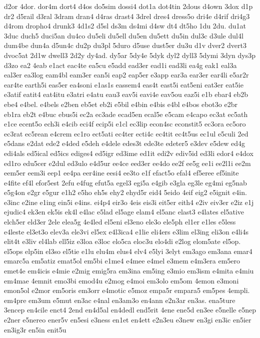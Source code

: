 {d2or
4dor.
dor4m
dort4
d4os
do5sim
dossi4
dot1a
dot4tin
2dous
d4own
3dox
d1p
dr2
d5rail
d3ral
3dram
dran4
d4ras
drast4
3drel
dres4
dress5o
dri4e
d4rif
dri4g3
d4rom
dropho4
drunk3
4d1s2
d5sl
ds3m
ds4mi
d4sw
dt4
dt5ho
1du
2du.
du1at
3duc
duch5
duci5an
du4co
du5eli
du5ell
du5en
du5ett
du5in
dul3c
d3ule
dul4l
dum4be
dun4a
d5un4c
du2p
du3pl
5duro
d5use
dust5er
du3u
d1v
dver2
dvert3
dvoc5at
2d1w
dwell3
2d2y
dy4ad.
dy5ar
5dy4e
5dyk
dyl2
dyll3
5dymi
3dyn
dys3p
d3zo
ea2
4eab
e1act
eac4te
ea5cu
e5add
ead3er
ead1i
ead3li
ea4g
eak1
eal3a
eal3er
ea3log
eam4bl
eam3er
ean5i
eap2
eap5er
e3app
ear3a
ear3er
ear4li
e5ar2r
ear4te
earth5i
eas5er
ea4soni
e1as1s
eassem4
eas4t
east5i
eat5eni
eat3er
eat5ie
e3atif
eatit4
eat4itu
e3atri
e4atu
eau3
eav5i
eavi4e
eav5ou
eaz5i
e1b
ebar4
eb2b
ebe4
e4bel.
e4bels
e2ben
eb5et
eb2i
e5bil
e4bin
e4bis
e4bl
e4bos
ebot3o
e2br
eb1ra
eb2t
e4buc
ebus5i
ec2a
ec3ade
ecad5en
ecal5e
e5cam
e4capo
ec3at
ec5ath
e1ce
ecent5o
ech3i
e4cib
eci4f
ecip5i
e1cl
ec3lip
econ4sc
econstit5
ec3ora
ec5oro
ec3rat
ec5rean
e4crem
ec1ro
ect5ati
ec4ter
ecti4c
ec4tit
ec4t5us
ec1ul
e5culi
2ed
e5dans
e2dat
ede2
e4ded
e5deh
e4dele
edes3t
ede3te
edeter5
e3dev
e5dew
ed4g
edi4als
ed5ical
ed5ics
ediges4
ed5igr
ed3ime
ed1it
edi2v
ediv5id
ed3li
edor4
e4dox
ed1ro
edu5cer
e2dul
ed3ulo
e4d5ur
ee4ce
eed3er
ee4do
ee2f
ee5g
ee1i
ee2l1i
ee2m
eem5er
eem3i
eep1
ee4pa
eer4ine
eesi4
ee3to
e1f
efact5o
efal4
ef5eree
ef5inite
e4fite
ef4l
efor5est
2efu
e4fug
efut5a
egel3
egi5a
e4gib
e3gla
eg3le
eg4mi
eg5nab
e5g4on
e2gr
e5gur
e1h2
e5ho
eh5s
ehy2
ehyd5r
eid4
5eido
4eif
eig2
e5ignit
e4in.
e3inc
e2ine
e1ing
ein5i
e4ins.
ei4p4
eir3o
4eis
eis3i
eit5er
eith4
e2iv
eiv3er
e2iz
e1j
ejudic4
ek3en
ek5is
ek4l
e4lac
e5lad
el5age
elam4
el5anc
elast3
e4lates
el5ative
elch5er
eld3er
2ele
elea5g
4e4led
el5eni
el3eno
ele3o
ele5ph
el1er
e1les
e5less
e4leste
el3et3o
elev3a
ele3vi
el5ex
e4l3ica4
e1lie
eli4ers
e3lim
el3ing
eli3on
e4li4s
elit4t
e3liv
el4lab
ell5iz
e3loa
e3loc
elo5ca
eloc3u
elo4di
e2log
elom5ate
el5op.
el5ops
elp5in
el3so
el5tie
e1lu
elu4m
elus4
elv4
e5lyi
3elyt
em3ago
em3ana
emar4
emarc5a
em5atiz
emat5ol
em5bi
e1me4
e4mee
e4mel
e3mem
e4m3era
em5ero
emet4e
em4icis
e4mie
e2mig
emig5ra
em3ina
em5ing
e3mio
em3ism
e4mita
e4miu
em4mae
4emnit
emo3bi
emod4u
e2mog
e4moi
em3olo
em5om
4emon
e3moni
emon5ol
e2mor
em5oris
em3orr
e4motic
e5moz
empa5r
empara5
em5pes
4empli.
em4pre
em3um
e5mut
en3ac
e4nal
en3am3o
en4ann
e2n3ar
en3as.
ena5ture
3encep
en4cile
enct4
2end
en4d5al
en4dedl
end5rit
4ene
ene5d
en3ee
e5nelle
e5nep
e2ner
e5nereo
ener5v
en5esi
e3ness
en1et
en4ett
e2n3eu
e3new
en3gi
en3ic
en5ier
en3ig3r
en5in
enit5u
}
